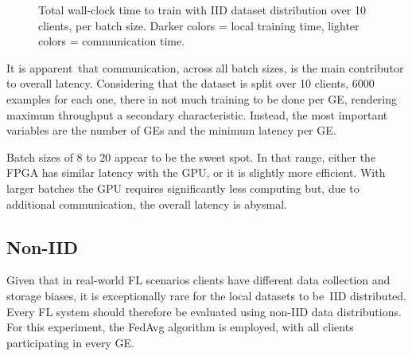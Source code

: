 \begin{figure}[H]
    
    \caption[ IID distribution, total time per GE ]{ Total wall-clock time to train with IID dataset distribution over 10 clients, per batch size. Darker colors = local training time, lighter colors = communication time. }
    \label{fig: IID, total time}
\end{figure}

It is apparent that communication, across all batch sizes, is the main contributor to overall latency. Considering that the dataset is split over 10 clients, 6000 examples for each one, there in not much training to be done per GE, rendering maximum throughput a secondary characteristic. Instead, the most important variables are the number of GEs and the minimum latency per GE. %

Batch sizes of 8 to 20 appear to be the sweet spot. In that range, either the FPGA has similar latency with the GPU, or it is slightly more efficient. With larger batches the GPU requires significantly less computing but, due to additional communication, the overall latency is abysmal. %

\subsection{Non-IID}
Given that in real-world FL scenarios clients have different data collection and storage biases, it is exceptionally rare for the local datasets to be IID distributed. Every FL system should therefore be evaluated using non-IID data distributions. For this experiment, the FedAvg algorithm is employed, with all clients participating in every GE. %

